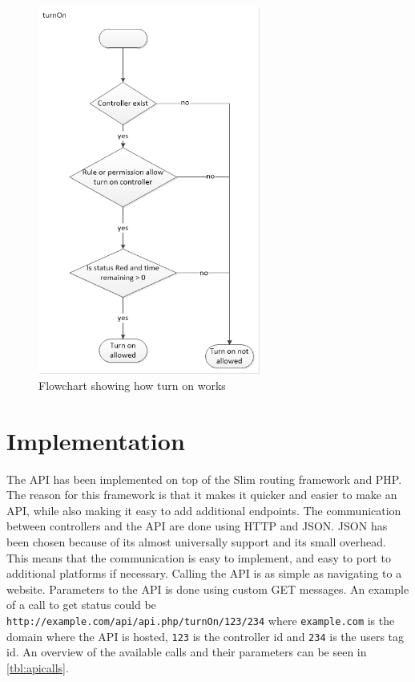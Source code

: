 \begin{figure}[!h]
	\centering
		\includegraphics[width=0.65\textwidth]{images/turnOnAPI1.jpg}
	\caption{Flowchart showing how turn on works}
	\label{fig:turnOnAPI1}
\end{figure}
 
\section{Implementation}
The API has been implemented on top of the Slim routing framework and PHP. The reason for this framework is that it makes it quicker and easier to make an API, while also making it easy to add additional endpoints. The communication between controllers and the API are done using HTTP and JSON. JSON has been chosen because of its almost universally support and its small overhead. This means that the communication is easy to implement, and easy to port to additional platforms if necessary. Calling the API is as simple as navigating to a website. Parameters to the API is done using custom GET messages. An example of a call to get status could be \texttt{http://example.com/api/api.php/turnOn/123/234} where \texttt{example.com} is the domain where the API is hosted, \texttt{123} is the controller id and \texttt{234} is the users tag id. An overview of the available calls and their parameters can be seen in \autoref{tbl:apicalls}.


